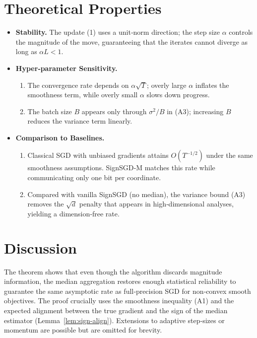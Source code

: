 \documentclass{article}
\begin{document}
\section*{Theoretical Properties}
\begin{itemize}
\item \textbf{Stability.} The update (1) uses a unit‑norm direction; the step size $\alpha$ controls the magnitude of the move, guaranteeing that the iterates cannot diverge as long as $\alpha L<1$.
\item \textbf{Hyper‑parameter Sensitivity.}
    \begin{enumerate}[label=\alph*)]
    \item The convergence rate depends on $\alpha\sqrt{T}$; overly large $\alpha$ inflates the smoothness term, while overly small $\alpha$ slows down progress.
    \item The batch size $B$ appears only through $\sigma^{2}/B$ in (A3); increasing $B$ reduces the variance term linearly.
    \end{enumerate}
\item \textbf{Comparison to Baselines.}
    \begin{enumerate}[label=\alph*)]
    \item Classical SGD with unbiased gradients attains $O(T^{-1/2})$ under the same smoothness assumptions.  SignSGD‑M matches this rate while communicating only one bit per coordinate.
    \item Compared with vanilla SignSGD (no median), the variance bound (A3) removes the $\sqrt{d}$ penalty that appears in high‑dimensional analyses, yielding a dimension‑free rate.
    \end{enumerate}
\end{itemize}

\section*{Discussion}
The theorem shows that even though the algorithm discards magnitude information,
the median aggregation restores enough statistical reliability to guarantee the same
asymptotic rate as full‑precision SGD for non‑convex smooth objectives.  The proof crucially
uses the smoothness inequality (A1) and the expected alignment between the true gradient
and the sign of the median estimator (Lemma~\ref{lem:sign-align}).  Extensions to
adaptive step‑sizes or momentum are possible but are omitted for brevity.

\newpage
\end{document}
